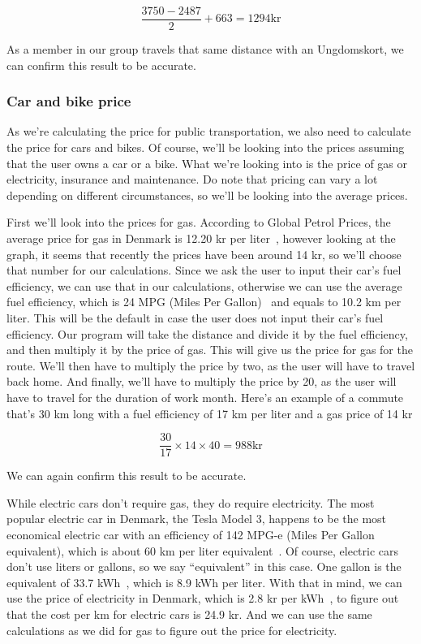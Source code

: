 \begin{equation}
    \frac{3750 - 2487}{2} + 663 = 1294 \text{kr}
\end{equation}

As a member in our group travels that same distance with an Ungdomskort, we can confirm this result to be accurate.

\subsubsection{Car and bike price}

As we're calculating the price for public transportation, we also need to calculate the price for cars and bikes.
Of course, we'll be looking into the prices assuming that the user owns a car or a bike.
What we're looking into is the price of gas or electricity, insurance and maintenance.
Do note that pricing can vary a lot depending on different circumstances, so we'll be looking into the average prices.

First we'll look into the prices for gas.
According to Global Petrol Prices, the average price for gas in Denmark is 12.20 kr per liter~\cite{price_gas}, however
looking at the graph, it seems that recently the prices have been around 14 kr, so we'll choose that number for our
calculations.
Since we ask the user to input their car's fuel efficiency, we can use that in our calculations, otherwise we can use
the average fuel efficiency, which is 24 MPG (Miles Per Gallon)~\cite{price_mpg} and equals to 10.2 km per liter.
This will be the default in case the user does not input their car's fuel efficiency.
Our program will take the distance and divide it by the fuel efficiency, and then multiply it by the price of gas.
This will give us the price for gas for the route.
We'll then have to multiply the price by two, as the user will have to travel back home.
And finally, we'll have to multiply the price by 20, as the user will have to travel for the duration of work month.
Here's an example of a commute that's 30 km long with a fuel efficiency of 17 km per liter and a gas price of 14 kr

\begin{equation}
    \frac{30}{17} \times 14 \times 40 = 988 \text{kr}
\end{equation}

We can again confirm this result to be accurate.

While electric cars don't require gas, they do require electricity.
The most popular electric car in Denmark, the Tesla Model 3, happens to be the most economical electric car with an
efficiency of 142 MPG-e (Miles Per Gallon equivalent), which is about 60 km per liter equivalent~\cite{price_el}.
Of course, electric cars don't use liters or gallons, so we say ``equivalent'' in this case.
One gallon is the equivalent of 33.7 kWh~\cite{price_mpge}, which is 8.9 kWh per liter.
With that in mind, we can use the price of electricity in Denmark, which is 2.8 kr per kWh~\cite{price_energy}, to
figure out that the cost per km for electric cars is 24.9 kr.
And we can use the same calculations as we did for gas to figure out the price for electricity.

